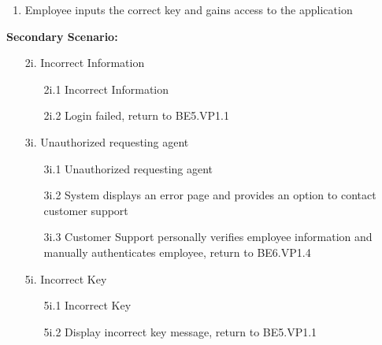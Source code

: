 \documentclass[]{article}
\begin{document}
\begin{enumerate}[{\bf BE1.}]
\begin{enumerate}[{\bf BE5.}]
\begin{enumerate}
\begin{enumerate}
                \item Employee inputs the correct key and gains access to the application 
            \end{enumerate}
            \textbf{Secondary Scenario:}
            \begin{enumerate}
                \item[2i.] Incorrect Information
                \begin{enumerate}
                    \item[2i.1] Incorrect Information
                    \item[2i.2] Login failed, return to BE5.VP1.1
                \end{enumerate}
                \item[3i.] Unauthorized requesting agent
                \begin{enumerate}
                    \item[3i.1] Unauthorized requesting agent
                    \item[3i.2] System displays an error page and provides an option to contact customer support
                    \item[3i.3]  Customer Support personally verifies employee information and manually authenticates employee, return to BE6.VP1.4
                \end{enumerate}
                \item[5i.] Incorrect Key
                \begin{enumerate}
                    \item[5i.1] Incorrect Key
                    \item[5i.2] Display incorrect key message, return to BE5.VP1.1 
                \end{enumerate}
            \end{enumerate}
        \end{enumerate}
\end{enumerate}


\end{enumerate}
\end{document}
